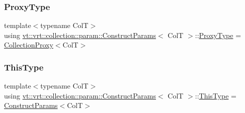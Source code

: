 \subsubsection{\texorpdfstring{Proxy\+Type}{ProxyType}}
{\footnotesize\ttfamily template$<$typename ColT$>$ \\
using \hyperlink{structvt_1_1vrt_1_1collection_1_1param_1_1_construct_params}{vt\+::vrt\+::collection\+::param\+::\+Construct\+Params}$<$ ColT $>$\+::\hyperlink{structvt_1_1vrt_1_1collection_1_1param_1_1_construct_params_a837fb2b2a036f898fb65da72d3ee2fb0}{Proxy\+Type} =  \hyperlink{structvt_1_1vrt_1_1collection_1_1_collection_proxy}{Collection\+Proxy}$<$ColT$>$}

\mbox{\label{structvt_1_1vrt_1_1collection_1_1param_1_1_construct_params_a13d4910c0f6825c7b0ddfebce5288bea}} 
\subsubsection{\texorpdfstring{This\+Type}{ThisType}}
{\footnotesize\ttfamily template$<$typename ColT$>$ \\
using \hyperlink{structvt_1_1vrt_1_1collection_1_1param_1_1_construct_params}{vt\+::vrt\+::collection\+::param\+::\+Construct\+Params}$<$ ColT $>$\+::\hyperlink{structvt_1_1vrt_1_1collection_1_1param_1_1_construct_params_a13d4910c0f6825c7b0ddfebce5288bea}{This\+Type} =  \hyperlink{structvt_1_1vrt_1_1collection_1_1param_1_1_construct_params}{Construct\+Params}$<$ColT$>$}

\mbox{\label{structvt_1_1vrt_1_1collection_1_1param_1_1_construct_params_a51c2b552a29b508b728b2e903d6073b1}} 
